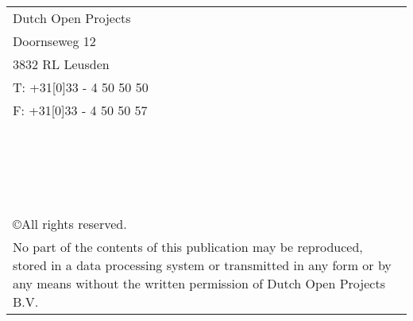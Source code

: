 \begin{tabularx}{4.6cm}{ X }
Dutch Open Projects			\\
Doornseweg 12					\\	
3832 RL Leusden					\\
T: +31[0]33 - 4 50 50 50		\\
F: +31[0]33 - 4 50 50 57		
\\*
\\*
\\*
\\*
\\*
\\*
\\*
\\*
\\*
\\*
\\*
\\*
\\*
\\*
\\*
\\*
\\*
\\*
\\*
\\*



\footnotesize
\copyright All rights reserved. 		\\*
\footnotesize
No part of the contents of this publication may be reproduced, stored in a data processing system or transmitted in any form or by any means without the written permission of Dutch Open Projects B.V.

\end{tabularx}
